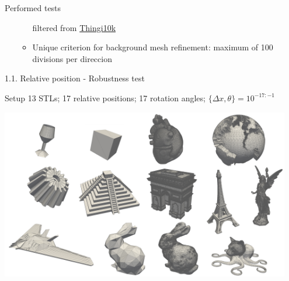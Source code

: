\documentclass{beamer}
\begin{document}
\begin{frame}{Performed tests}
\begin{itemize}
\begin{itemize}
          filtered from \href{https://ten-thousand-models.appspot.com}{Thingi10k}
        \item
          Unique criterion for background mesh refinement: maximum of 100 divisions per direccion
      \end{itemize}
  \end{itemize}
%
%
%
%    
%    
%
%
\end{frame}

\begin{frame}{1.1. Relative position - Robustness test}
  \begin{block}{Setup}
    13 STLs; 17 relative positions; 17 rotation angles;  $\{\Delta x, \theta\} = 10^{-17:-1}$
  \end{block}
  \includegraphics[width=0.95\textwidth]{matrix.pdf}
\end{frame}
\end{document}
